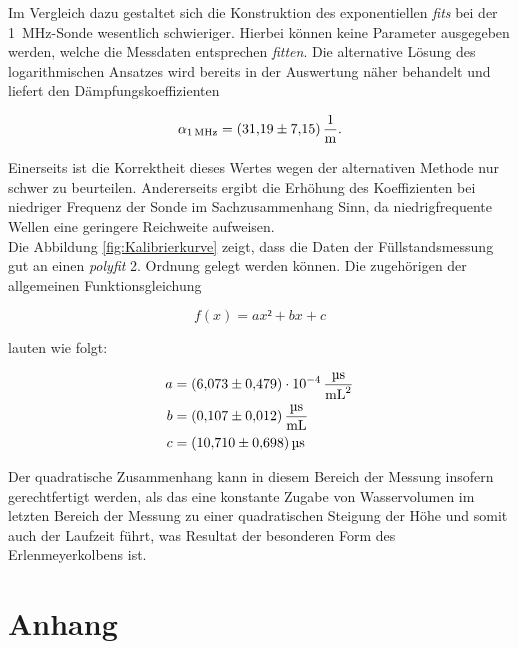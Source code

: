 \noindent Im Vergleich dazu gestaltet sich die Konstruktion des exponentiellen \emph{fits} bei der \qty{1}{\mega\hertz}-Sonde wesentlich 
schwieriger. Hierbei können keine Parameter ausgegeben werden, welche die Messdaten entsprechen \emph{fitten}. Die alternative Lösung des 
logarithmischen Ansatzes wird bereits in der Auswertung näher behandelt und liefert den Dämpfungskoeffizienten

\begin{align*}
    \alpha_{\qty{1}{\mega\hertz}} = \qty{31.19\pm7.15}{\per\meter}.
\end{align*}

\noindent Einerseits ist die Korrektheit dieses Wertes wegen der alternativen Methode nur schwer zu beurteilen. Andererseits 
ergibt die Erhöhung des Koeffizienten bei niedriger Frequenz der Sonde im Sachzusammenhang Sinn, da niedrigfrequente Wellen 
eine geringere Reichweite aufweisen.\\

\noindent Die Abbildung \ref{fig:Kalibrierkurve} zeigt, dass die Daten der Füllstandsmessung gut an einen \emph{polyfit} 2.
Ordnung gelegt werden können. Die zugehörigen der allgemeinen Funktionsgleichung

\begin{equation*}
    f(x) = ax² + bx + c
\end{equation*}

\noindent lauten wie folgt:

\begin{align*}
    a &= \qty{6.073\pm0.479e-4}{\micro\second\per\milli\liter\squared}\\  
    b &= \qty{0.107\pm0.012}{\micro\second\per\milli\liter}\\
    c &= \qty{10.71\pm0.698}{\micro\second }
\end{align*}

\noindent Der quadratische Zusammenhang kann in diesem Bereich der Messung insofern gerechtfertigt werden, als das eine konstante 
Zugabe von Wasservolumen im letzten Bereich der Messung zu einer quadratischen Steigung der Höhe und somit auch der Laufzeit 
führt, was Resultat der besonderen Form des Erlenmeyerkolbens ist. 

\section{Anhang}


